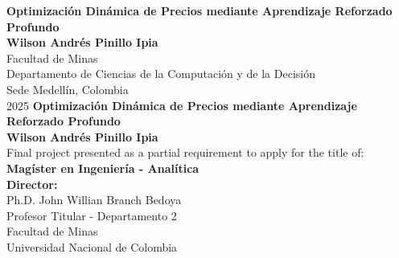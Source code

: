 \documentclass[10pt,english,fleqn,openany,twoside,letterpaper]{book}
\newcommand{\studentname}{}
\newcommand{\academictitle}{}
\newcommand{\thesisname}{}
\newcommand{\director}{}
\newcommand{\directortitle}{}
\newcommand{\issuedate}{}
\newcommand{\sede}{}
\newcommand{\department}{}
\newcommand{\departmenttwo}{} %
\newcommand{\faculty}{}
\newcommand{\university}{Universidad Nacional de Colombia}
\renewcommand{\studentname}{Wilson Andrés Pinillo Ipia}
\renewcommand{\thesisname}{Optimización Dinámica de Precios mediante Aprendizaje Reforzado
Profundo}
\renewcommand{\issuedate}{2025}
\renewcommand{\director}{Ph.D. John Willian Branch Bedoya}
\renewcommand{\directortitle}{Profesor Titular}
\renewcommand{\academictitle}{Magíster en Ingeniería - Analítica}
\renewcommand{\sede}{Sede Medellín}
\renewcommand{\department}{Departamento de Ciencias de la Computación y de la Decisión}
\renewcommand{\departmenttwo}{Departamento 2} %
\renewcommand{\faculty}{Facultad de Minas}
\begin{document}
\renewcommand{\listfigurename}{\sffamily List of Figures}
\renewcommand{\listtablename}{\sffamily List of Tables}
\renewcommand{\contentsname}{\sffamily Contents}
\renewcommand{\chaptername}{\sffamily Chapter}
\renewcommand{\tablename}{\scriptsize \centering \textbf{Table}}
\renewcommand{\figurename}{\scriptsize \centering \textbf{Figure}}
\renewcommand{\appendixname}{\sffamily Appendix}

\renewcommand{\bibname}{\sffamily References}

{\newpage
\thispagestyle{empty}
\begin{center}
\begin{figure}
\centering
{}%
\end{figure}
\vspace{2.5cm}
\textbf{\Huge \thesisname} \\ 
\vspace{2.5cm}
\textbf{\Large \studentname} \\
\vspace{5.0cm}
\faculty \\ \department \\
\sede, Colombia \\
\issuedate
\newpage 
\thispagestyle{empty}
\vspace{2.0cm}
\textbf{\Huge \thesisname} \\
\vspace{2.0cm}
\textbf{\Large \studentname} \\
\vspace{2.0cm}
\small Final project presented as a partial requirement to apply for the title of: \\
{\bfseries \academictitle}\\
\vspace{2.0cm}
\textbf{Director:} \\
\director \\
\directortitle \; - \departmenttwo \\
\faculty \\
\university \\ 

\end{center}}
\end{document}
